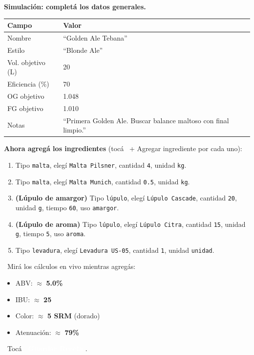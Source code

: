 \documentclass[11pt,a4paper]{report}
\newcommand{\appbtn}[1]{%
  \textcolor{white}{\colorbox{beer}{\footnotesize\sffamily\bfseries\ #1}}%
}
\newcommand{\appbtnsec}[1]{%
  \colorbox{black!10}{\footnotesize\sffamily\ #1}%
}
\begin{document}
\begin{simbox}
\textbf{Simulación: completá los datos generales.}

\begin{tabular}{ll}
\toprule
\textbf{Campo} & \textbf{Valor} \\
\midrule
Nombre             & ``Golden Ale Tebana'' \\
Estilo             & ``Blonde Ale'' \\
Vol. objetivo (L)  & 20 \\
Eficiencia (\%)    & 70 \\
OG objetivo        & 1.048 \\
FG objetivo        & 1.010 \\
Notas              & ``Primera Golden Ale. Buscar balance maltoso con final limpio.'' \\
\bottomrule
\end{tabular}

\medskip
\textbf{Ahora agregá los ingredientes} (tocá \appbtnsec{+ Agregar ingrediente} por cada uno):

\begin{enumerate}[leftmargin=*]
  \item Tipo \texttt{malta}, elegí \texttt{Malta Pilsner}, cantidad \texttt{4}, unidad \texttt{kg}.
  \item Tipo \texttt{malta}, elegí \texttt{Malta Munich}, cantidad \texttt{0.5}, unidad \texttt{kg}.
  \item \textbf{(Lúpulo de amargor)} Tipo \texttt{lúpulo}, elegí \texttt{Lúpulo Cascade}, cantidad \texttt{20}, unidad \texttt{g}, tiempo \texttt{60}, uso \texttt{amargor}.
  \item \textbf{(Lúpulo de aroma)} Tipo \texttt{lúpulo}, elegí \texttt{Lúpulo Citra}, cantidad \texttt{15}, unidad \texttt{g}, tiempo \texttt{5}, uso \texttt{aroma}.
  \item Tipo \texttt{levadura}, elegí \texttt{Levadura US-05}, cantidad \texttt{1}, unidad \texttt{unidad}.
\end{enumerate}

\medskip
\textcolor{accent}{\faEye\ Mirá los cálculos en vivo mientras agregás:}
\begin{itemize}
  \item ABV: $\approx$ \textbf{5.0\%}
  \item IBU: $\approx$ \textbf{25}
  \item Color: $\approx$ \textbf{5 SRM} (dorado)
  \item Atenuación: $\approx$ \textbf{79\%}
\end{itemize}

\medskip
\textcolor{accent}{\faArrowRight\ Tocá \appbtn{Guardar Receta}.}
\end{simbox}
\end{document}
